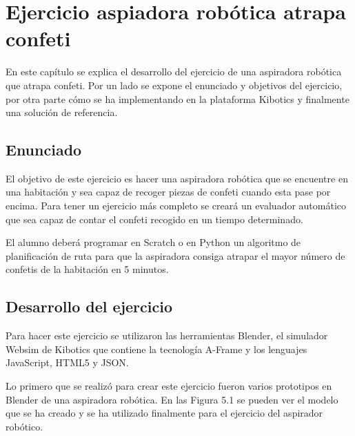 \chapter{Ejercicio aspiadora robótica atrapa confeti}\label{chap:aspiradora}
En este capítulo se explica el desarrollo del ejercicio de una aspiradora robótica que atrapa confeti. Por un lado se expone el enunciado y objetivos del ejercicio, por otra parte cómo se ha implementando en la plataforma Kibotics y finalmente una solución de referencia.


\section{Enunciado}
El objetivo de este ejercicio es hacer una aspiradora robótica que se encuentre en una habitación y sea capaz de recoger piezas de confeti cuando esta pase por encima. Para tener un ejercicio más completo se creará un evaluador automático que sea capaz de contar el confeti recogido en un tiempo determinado.

El alumno deberá programar en Scratch o en Python un algoritmo de planificación de ruta para que la aspiradora consiga atrapar el mayor número de confetis de la habitación en 5 minutos.

\section{Desarrollo del ejercicio}
Para hacer este ejercicio se utilizaron las herramientas Blender, el simulador Websim de Kibotics que contiene la tecnología A-Frame y los lenguajes JavaScript, HTML5 y JSON.

Lo primero que se realizó para crear este ejercicio fueron varios prototipos en Blender de una aspiradora robótica. En las Figura 5.1 se pueden ver el modelo que se ha creado y se ha utilizado finalmente para el ejercicio del aspirador robótico.
 
